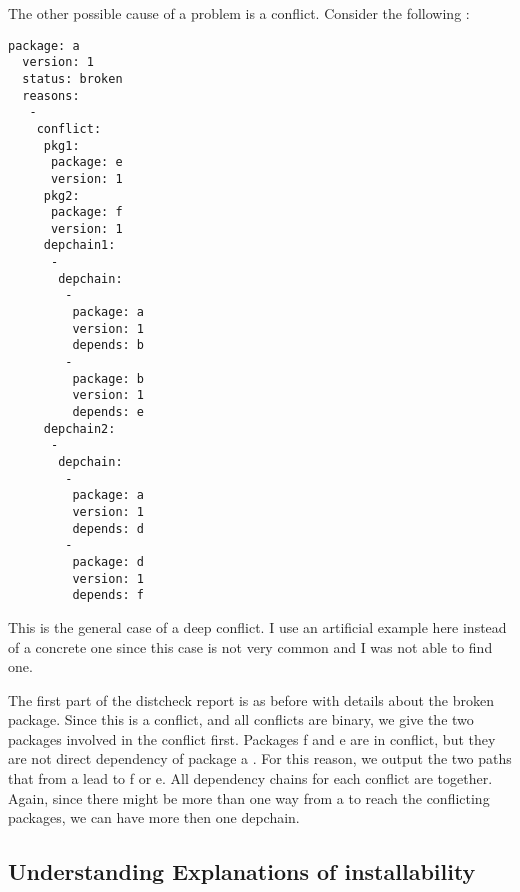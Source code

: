 The other possible cause of a problem is a conflict. Consider the following :

\begin{verbatim}
package: a
  version: 1
  status: broken
  reasons:
   -
    conflict:
     pkg1:
      package: e
      version: 1
     pkg2:
      package: f
      version: 1
     depchain1:
      -
       depchain:
        -
         package: a
         version: 1
         depends: b
        -
         package: b
         version: 1
         depends: e
     depchain2:
      -
       depchain:
        -
         package: a
         version: 1
         depends: d
        -
         package: d
         version: 1
         depends: f
\end{verbatim}

This is the general case of a deep conflict. I use an artificial example here
instead of a concrete one since this case is not very common and I was not able
to find one.

The first part of the distcheck report is as before with details about the
broken package. Since this is a conflict, and all conflicts are binary, we give
the two packages involved in the conflict first. Packages f and e are in
conflict, but they are not direct dependency of package a . For this reason, we
output the two paths that from a lead to f or e. All dependency chains for each
conflict are together. Again, since there might be more than one way from a to
reach the conflicting packages, we can have more then one depchain. 

\subsection{Understanding Explanations of installability}


